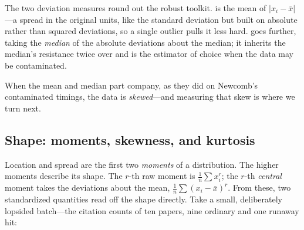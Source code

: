 The two deviation measures round out the robust toolkit.  is the
mean of \(\lvert x_i - \bar x\rvert\)---a spread in the original units, like the
standard deviation but built on absolute rather than squared deviations, so a single
outlier pulls it less hard.  goes further, taking the
\emph{median} of the absolute deviations about the median; it inherits the median's
resistance twice over and is the estimator of choice when the data may be
contaminated.


When the mean and median part company, as they did on Newcomb's contaminated
timings, the data is \emph{skewed}---and measuring that skew is where we turn next.

\subsection{Shape: moments, skewness, and kurtosis}
\label{ssec:stat-shape}

Location and spread are the first two \emph{moments} of a distribution. The higher
moments describe its shape. The \(r\)-th raw moment is \(\tfrac1n\sum x_i^r\); the
\(r\)-th \emph{central} moment takes the deviations about the mean,
\(\tfrac1n\sum (x_i-\bar x)^r\). From these, two standardized quantities read off
the shape directly. Take a small, deliberately lopsided batch---the citation
counts of ten papers, nine ordinary and one runaway hit:

\begin{codepairs}
\end{codepairs}

